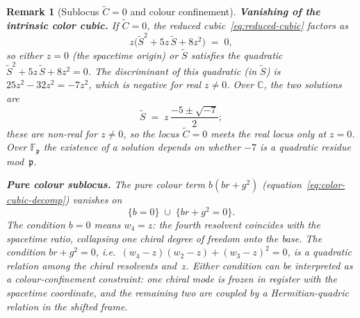 \documentclass[12pt,a4paper]{report}
\newtheorem{remark}[theorem]{Remark}
\newcommand{\pp}{\mathfrak{p}}
\begin{document}
\begin{remark}[Sublocus $\widetilde{C}=0$ and colour confinement]
\label{rem:color-tube-subloci}
  \textbf{Vanishing of the intrinsic color cubic.}\;
  If $\widetilde{C} = 0$, the reduced cubic~\eqref{eq:reduced-cubic}
  factors as
  \begin{equation}\label{eq:reduced-cubic-factored}
    z\bigl(\widetilde{S}^2 + 5z\,\widetilde{S} + 8z^2\bigr) \;=\; 0,
  \end{equation}
  so either $z = 0$ (the spacetime origin) or $\widetilde{S}$ satisfies
  the quadratic $\widetilde{S}^2 + 5z\,\widetilde{S} + 8z^2 = 0$.
  The discriminant of this quadratic (in $\widetilde{S}$) is
  $25z^2 - 32z^2 = -7z^2$, which is negative for real $z \ne 0$.
  Over $\mathbb{C}$, the two solutions are
  \[
    \widetilde{S} \;=\; z\,\frac{-5 \pm \sqrt{-7}}{2};
  \]
  these are non-real for $z \ne 0$, so the locus $\widetilde{C} = 0$
  meets the real locus only at $z = 0$.  Over $\mathbb{F}_\pp$ the
  existence of a solution depends on whether $-7$ is a quadratic
  residue mod~$\pp$.

  \medskip
  \noindent\textbf{Pure colour sublocus.}\;
  The pure colour term $b(br + g^2)$
  (equation~\eqref{eq:color-cubic-decomp}) vanishes on
  \[
    \{b = 0\} \;\cup\; \{br + g^2 = 0\}.
  \]
  The condition $b = 0$ means $w_4 = z$: the fourth resolvent
  coincides with the spacetime ratio, collapsing one chiral degree of
  freedom onto the base.  The condition $br + g^2 = 0$, i.e.\
  $(w_4 - z)(w_2 - z) + (w_3 - z)^2 = 0$, is a quadratic relation
  among the chiral resolvents and~$z$.  Either condition can be
  interpreted as a \emph{colour-confinement} constraint: one chiral
  mode is frozen in register with the spacetime coordinate, and the
  remaining two are coupled by a Hermitian-quadric relation in the
  shifted frame.
\end{remark}
\end{document}
